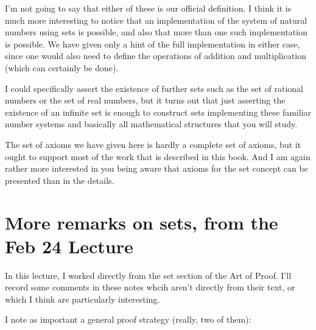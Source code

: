 \documentclass[12pt]{article}
\begin{document}
I'm not going to say that either of these is our official definition.  I think it is much more interesting to notice that an implementation of the system of natural numbers using sets is possible, and also that more than one such implementation is possible.  We have given only a hint of the full implementation in either case, since one would also need to define the operations of addition and multiplication (which can certainly be done).

I could specifically assert the existence of further sets such as the set of rational numbers or the set of real numbers, but it turns out that just asserting the existence of an infinite set is enough to construct sets implementing these familiar number systems and basically all mathematical structures that you will study.

The set of axioms we have given here is hardly a complete set of axioms, but it ought to support most of the work that is described in this book.  And I am again rather more interested in you being aware that axioms for the set concept can be presented than in the details.

\section{More remarks on sets, from the Feb 24 Lecture}

In this lecture, I worked directly from the set section of the Art of Proof.  I'll record some comments in these notes whcih aren't directly from their text, or which I think are particularly interesting.

I note as important a general proof strategy (really, two of them):
\end{document}

